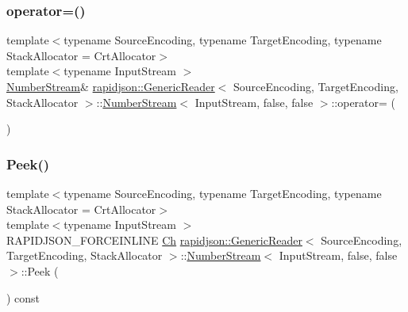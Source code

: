 \subsubsection{\texorpdfstring{operator=()}{operator=()}}
{\footnotesize\ttfamily template$<$typename Source\+Encoding, typename Target\+Encoding, typename Stack\+Allocator = Crt\+Allocator$>$ \\
template$<$typename Input\+Stream $>$ \\
\mbox{\hyperlink{classrapidjson_1_1_generic_reader_1_1_number_stream}{Number\+Stream}}\& \mbox{\hyperlink{classrapidjson_1_1_generic_reader}{rapidjson\+::\+Generic\+Reader}}$<$ Source\+Encoding, Target\+Encoding, Stack\+Allocator $>$\+::\mbox{\hyperlink{classrapidjson_1_1_generic_reader_1_1_number_stream}{Number\+Stream}}$<$ Input\+Stream, false, false $>$\+::operator= (\begin{DoxyParamCaption}\item[{const \mbox{\hyperlink{classrapidjson_1_1_generic_reader_1_1_number_stream}{Number\+Stream}}$<$ Input\+Stream, false, false $>$ \&}]{ }\end{DoxyParamCaption})\hspace{0.3cm}{\ttfamily [protected]}}

\mbox{\label{classrapidjson_1_1_generic_reader_1_1_number_stream_3_01_input_stream_00_01false_00_01false_01_4_a0b923b6e8529d0e52ace7b20bd502278}} 
\subsubsection{\texorpdfstring{Peek()}{Peek()}}
{\footnotesize\ttfamily template$<$typename Source\+Encoding, typename Target\+Encoding, typename Stack\+Allocator = Crt\+Allocator$>$ \\
template$<$typename Input\+Stream $>$ \\
R\+A\+P\+I\+D\+J\+S\+O\+N\+\_\+\+F\+O\+R\+C\+E\+I\+N\+L\+I\+NE \mbox{\hyperlink{classrapidjson_1_1_generic_reader_1_1_number_stream_3_01_input_stream_00_01false_00_01false_01_4_a2a945ef08d04099027c32f72821a12c0}{Ch}} \mbox{\hyperlink{classrapidjson_1_1_generic_reader}{rapidjson\+::\+Generic\+Reader}}$<$ Source\+Encoding, Target\+Encoding, Stack\+Allocator $>$\+::\mbox{\hyperlink{classrapidjson_1_1_generic_reader_1_1_number_stream}{Number\+Stream}}$<$ Input\+Stream, false, false $>$\+::Peek (\begin{DoxyParamCaption}{ }\end{DoxyParamCaption}) const}




